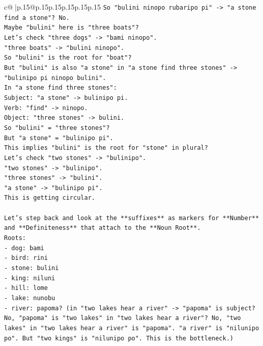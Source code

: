 \documentclass{article}
\begin{document}
{\begin{supertabular}{c@{$\;$}|p{.15\linewidth}@{}p{.15\linewidth}p{.15\linewidth}p{.15\linewidth}p{.15\linewidth}p{.15\linewidth}}
{{{\texttt{So "bulini ninopo rubaripo pi" {-}> "a stone find a stone"? No.} \\
\texttt{Maybe "bulini" here is "three boats"?} \\
\texttt{Let's check "three dogs" {-}> "bami ninopo".} \\
\texttt{"three boats" {-}> "bulini ninopo".} \\
\texttt{So "bulini" is the root for "boat"?} \\
\texttt{But "bulini" is also "a stone" in "a stone find three stones" {-}> "bulinipo pi ninopo bulini".} \\
\texttt{In "a stone find three stones":} \\
\texttt{Subject: "a stone" {-}> bulinipo pi.} \\
\texttt{Verb: "find" {-}> ninopo.} \\
\texttt{Object: "three stones" {-}> bulini.} \\
\texttt{So "bulini" = "three stones"?} \\
\texttt{But "a stone" = "bulinipo pi".} \\
\texttt{This implies "bulini" is the root for "stone" in plural?} \\
\texttt{Let's check "two stones" {-}> "bulinipo".} \\
\texttt{"two stones" {-}> "bulinipo".} \\
\texttt{"three stones" {-}> "bulini".} \\
\texttt{"a stone" {-}> "bulinipo pi".} \\
\texttt{This is getting circular.} \\
\\ 
\texttt{Let's step back and look at the **suffixes** as markers for **Number** and **Definiteness** that attach to the **Noun Root**.} \\
\texttt{Roots:} \\
\texttt{{-} dog: bami} \\
\texttt{{-} bird: rini} \\
\texttt{{-} stone: bulini} \\
\texttt{{-} king: niluni} \\
\texttt{{-} hill: lome} \\
\texttt{{-} lake: nunobu} \\
\texttt{{-} river: papoma? (in "two lakes hear a river" {-}> "papoma" is subject? No, "papoma" is "two lakes" in "two lakes hear a river"? No, "two lakes" in "two lakes hear a river" is "papoma". "a river" is "nilunipo po". But "two kings" is "nilunipo po". This is the bottleneck.)} \\
}}}
\end{supertabular}}
\end{document}
